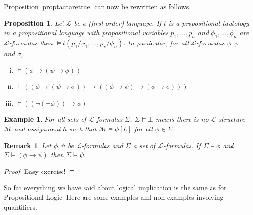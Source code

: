 \documentclass[11pt]{article}
\newtheorem{example}[theorem]{Example}
\newtheorem{remark}[theorem]{Remark}
\newtheorem{proposition}[theorem]{Proposition}
\newcommand{\mcal}[1]{\mathcal{#1}}
\begin{document}

Proposition \ref{proptautaretrue} can now be rewritten as follows.

\begin{proposition}
Let $\mcal{L}$ be a (first order) language. If $t$ is a propositional tautology in a propositional language with propositional variables $p_1,\ldots,p_n$ and $\phi_1,\ldots,\phi_n$ are $\mcal{L}$-formulas then $\models t(p_1/\phi_1,\ldots,p_n/\phi_n)$. In particular, for all $\mcal{L}$-formulas $\phi,\psi$ and $\sigma$,
\begin{enumerate}[(i)]
\item $\models(\phi\rightarrow (\psi\rightarrow \phi))$
\item $\models((\phi\rightarrow (\psi\rightarrow \sigma))\rightarrow ((\phi\rightarrow \psi)\rightarrow (\phi\rightarrow \sigma)))$
\item $\models((\neg(\neg \phi))\rightarrow \phi)$
\end{enumerate}
\end{proposition}


\begin{example}
For all sets of $\mcal{L}$-formulas $\Sigma$, $\Sigma\models \bot$ means there is no $\mcal{L}$-structure $\mcal{M}$ and assignment $h$ such that $\mcal{M}\models \phi[h]$ for all $\phi\in \Sigma$.
\end{example}

\begin{remark}\label{MPfortruth}
Let $\phi,\psi$ be $\mcal{L}$-formulas and $\Sigma$ a set of $\mcal{L}$-formulas. If $\Sigma \models \phi$ and $\Sigma \models (\phi\rightarrow \psi)$ then $\Sigma \models \psi$.
\end{remark}
\begin{proof}
Easy exercise!
\end{proof}

So far everything we have said about logical implication is the same as for Propositional Logic. Here are some examples and non-examples involving quantifiers.
\end{document}
